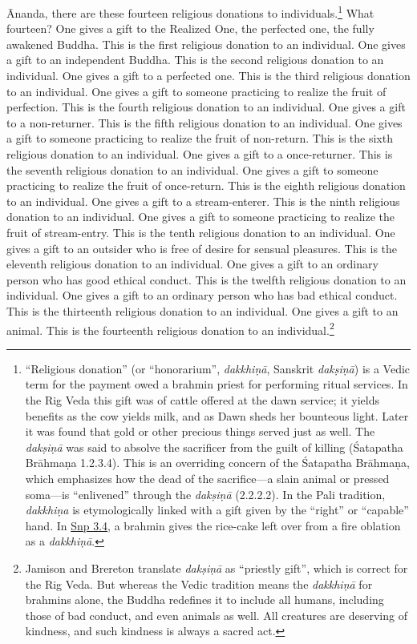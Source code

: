 \documentclass[12pt,openany]{book}%
\begin{document}
Ānanda, there are these fourteen religious donations to individuals.\footnote{“Religious donation” (or “honorarium”, \textit{\textsanskrit{dakkhiṇā}}, Sanskrit \textit{\textsanskrit{dakṣiṇā}}) is a Vedic term for the payment owed a brahmin priest for performing ritual services. In the Rig Veda this gift was of cattle offered at the dawn service; it yields benefits as the cow yields milk, and as Dawn sheds her bounteous light. Later it was found that gold or other precious things served just as well. The \textit{\textsanskrit{dakṣiṇā}} was said to absolve the sacrificer from the guilt of killing (Śatapatha \textsanskrit{Brāhmaṇa} 1.2.3.4). This is an overriding concern of the Śatapatha \textsanskrit{Brāhmaṇa}, which emphasizes how the dead of the sacrifice—a slain animal or pressed soma—is “enlivened” through the \textit{\textsanskrit{dakṣiṇā}} (2.2.2.2). In the Pali tradition, \textit{\textsanskrit{dakkhiṇa}} is etymologically linked with a gift given by the “right” or “capable” hand. In \href{https://suttacentral.net/snp3.4/en/sujato}{Snp 3.4}, a brahmin gives the rice-cake left over from a fire oblation as a \textit{\textsanskrit{dakkhiṇā}}. } What fourteen? One gives a gift to the Realized One, the perfected one, the fully awakened Buddha. This is the first religious donation to an individual. One gives a gift to an independent Buddha. This is the second religious donation to an individual. One gives a gift to a perfected one. This is the third religious donation to an individual. One gives a gift to someone practicing to realize the fruit of perfection. This is the fourth religious donation to an individual. One gives a gift to a non-returner. This is the fifth religious donation to an individual. One gives a gift to someone practicing to realize the fruit of non-return. This is the sixth religious donation to an individual. One gives a gift to a once-returner. This is the seventh religious donation to an individual. One gives a gift to someone practicing to realize the fruit of once-return. This is the eighth religious donation to an individual. One gives a gift to a stream-enterer. This is the ninth religious donation to an individual. One gives a gift to someone practicing to realize the fruit of stream-entry. This is the tenth religious donation to an individual. One gives a gift to an outsider who is free of desire for sensual pleasures. This is the eleventh religious donation to an individual. One gives a gift to an ordinary person who has good ethical conduct. This is the twelfth religious donation to an individual. One gives a gift to an ordinary person who has bad ethical conduct. This is the thirteenth religious donation to an individual. One gives a gift to an animal. This is the fourteenth religious donation to an individual.\footnote{Jamison and Brereton translate \textit{\textsanskrit{dakṣiṇā}} as “priestly gift”, which is correct for the Rig Veda. But whereas the Vedic tradition means the \textit{\textsanskrit{dakkhiṇā}} for brahmins alone, the Buddha redefines it to include all humans, including those of bad conduct, and even animals as well. All creatures are deserving of kindness, and such kindness is always a sacred act. } 
\end{document}
